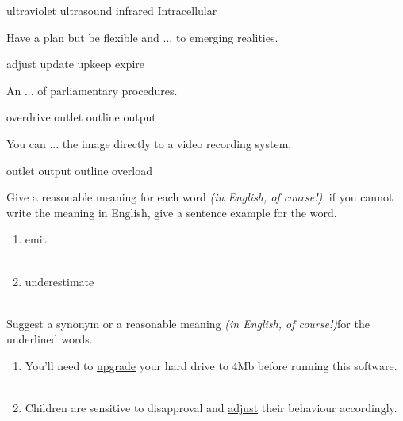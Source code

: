 \documentclass{exam}
\begin{document}
\begin{questions}
\begin{oneparchoices}
\choice ultraviolet
\choice ultrasound
\choice infrared
\correctchoice Intracellular
\end{oneparchoices}
\question Have a plan but be flexible and ... to emerging realities.\\
\begin{oneparchoices}
\correctchoice adjust
\choice update
\choice upkeep
\choice expire
\end{oneparchoices}
\question An ... of parliamentary procedures.\\
\begin{oneparchoices}
\choice overdrive
\choice outlet
\correctchoice outline
\choice output
\end{oneparchoices}
\question You can ... the image directly to a video recording system.\\
\begin{oneparchoices}
\choice outlet
\correctchoice output
\choice outline
\choice overload
\end{oneparchoices}
\question Give a reasonable meaning for each word \emph{(in English, of course!)}. if you cannot write the meaning in English, give a sentence example for the word.\\
\begin{enumerate}
	\item emit \\ \\
	\item underestimate \\ \\
\end{enumerate}
\question Suggest a synonym or a reasonable meaning \emph{(in English, of course!)}for the underlined words.\\
\begin{enumerate}
	\item You'll need to \underline{upgrade} your hard drive to 4Mb before running this software.\\ \\
	\item Children are sensitive to disapproval and \underline{adjust} their behaviour accordingly.\\ \\
\end{enumerate}

\end{questions}
\end{document}
